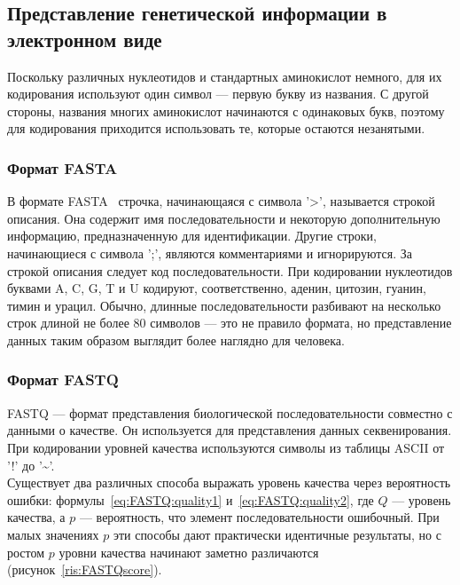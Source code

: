 \subsection[Представление генетической информации в электронном виде]{\large Представление генетической информации в электронном виде}
\hspace{\parindent} Поскольку различных нуклеотидов и стандартных аминокислот немного, для их кодирования используют один символ --- первую букву из названия. С другой стороны, названия многих аминокислот начинаются с одинаковых букв, поэтому для кодирования приходится использовать те, которые остаются незанятыми.

\subsubsection[Формат FASTA]{\large Формат FASTA}
\hspace{\parindent} В формате FASTA~\cite{FASTAformat} строчка, начинающаяся с символа '>', называется строкой описания. Она содержит имя последовательности и некоторую дополнительную информацию, предназначенную для идентификации. Другие строки, начинающиеся с символа ';', являются комментариями и игнорируются. За строкой описания следует код последовательности. При кодировании нуклеотидов буквами A, C, G, T и U кодируют, соответственно, аденин, цитозин, гуанин, тимин и урацил. Обычно, длинные последовательности разбивают на несколько строк длиной не более 80 символов --- это не правило формата, но представление данных таким образом выглядит более наглядно для человека.

\subsubsection[Формат FASTQ]{\large Формат FASTQ}
\hspace{\parindent} FASTQ --- формат представления биологической последовательности совместно с данными о качестве. Он используется для представления данных секвенирования. При кодировании уровней качества используются символы из таблицы ASCII от '!' до '\textasciitilde'.\\
\indent Существует два различных способа выражать уровень качества через вероятность ошибки: формулы~\ref{eq:FASTQ:quality1} и~\ref{eq:FASTQ:quality2}, где $Q$ --- уровень качества, а $p$ --- вероятность, что элемент последовательности ошибочный. При малых значениях $p$ эти способы дают практически идентичные результаты, но с ростом $p$ уровни качества начинают заметно различаются (рисунок~\ref{ris:FASTQscore}).


